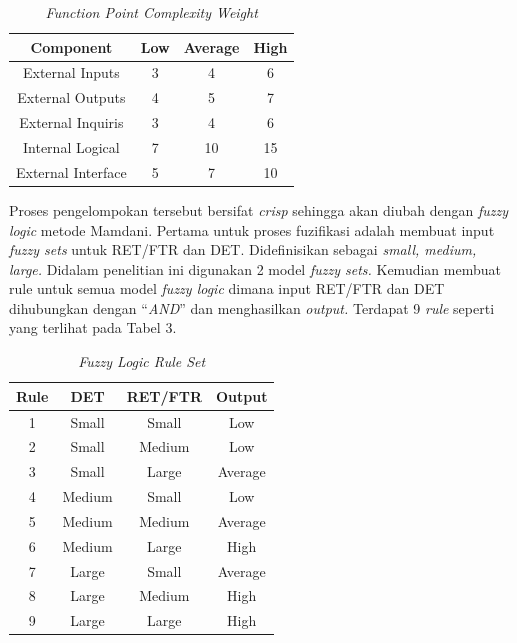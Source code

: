 \documentclass[a4paper]{article}
\begin{document}
\begin{multicols}{2}
\begin{table}[H]
    \centering
    \caption{\textit{Function Point Complexity Weight} \citep{Jones2008}}
    \bigskip
    \begin{tabular}{|c|c|c|c|}
        \hline
        \textbf{Component} & \textbf{Low} & \textbf{Average} & \textbf{High}\\
        \hline
        External Inputs & 3 & 4 & 6\\
        External Outputs & 4 & 5 & 7\\
        External Inquiris & 3 & 4 & 6\\
        Internal Logical & 7 & 10 & 15\\
        External Interface & 5 & 7 & 10\\
        \hline
    \end{tabular}
    \label{tab2}
\end{table}

\par Proses pengelompokan tersebut bersifat \textit{crisp} sehingga akan diubah dengan \textit{fuzzy logic} metode Mamdani. Pertama untuk proses fuzifikasi adalah membuat input \textit{fuzzy sets} untuk RET/FTR dan DET. Didefinisikan sebagai \textit{small, medium, large.} Didalam penelitian ini digunakan 2 model \textit{fuzzy sets.} Kemudian membuat rule untuk semua model \textit{fuzzy logic} dimana input RET/FTR dan DET dihubungkan dengan “\textit{AND}” dan menghasilkan \textit{output.} Terdapat 9 \textit{rule} seperti yang terlihat pada Tabel 3.

\begin{table}[H]
    \centering
    \caption{\textit{Fuzzy Logic Rule Set}}
    \bigskip
    \begin{tabular}{|c|c|c|c|}
        \hline
        \textbf{Rule} & \textbf{DET} & \textbf{RET/FTR} & \textbf{Output}\\
        \hline
        1 & Small & Small & Low\\
        2 & Small & Medium & Low\\
        3 & Small & Large & Average\\
        4 & Medium & Small & Low\\
        5 & Medium & Medium & Average\\
        6 & Medium & Large & High\\
        7 & Large & Small & Average\\
        8 & Large & Medium & High\\
        9 & Large & Large & High\\
        \hline
    \end{tabular}
    \label{tab3}
\end{table}


\end{multicols}
\end{document}
